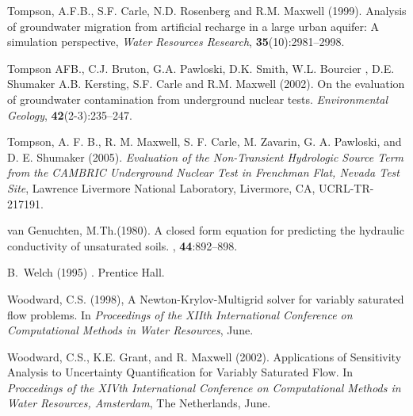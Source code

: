 \begin{thebibliography}{99}
  Tompson, A.F.B., S.F. Carle, N.D. Rosenberg and R.M. Maxwell
 (1999). Analysis of groundwater migration from artificial recharge in a large
 urban aquifer: A simulation perspective, {\em Water Resources
Research}, {\bf 35}(10):2981--2998.

Tompson AFB., C.J. Bruton, G.A. Pawloski, D.K. Smith, W.L. Bourcier , D.E. Shumaker A.B. Kersting, S.F. Carle and R.M. Maxwell (2002). On the evaluation of groundwater contamination from underground nuclear tests.  {\em Environmental Geology}, {\bf 42}(2-3):235--247.

Tompson, A. F. B., R. M. Maxwell, S. F. Carle, M. Zavarin, G. A. Pawloski, and D. E. Shumaker (2005). {\em Evaluation of the Non-Transient Hydrologic Source Term from the CAMBRIC Underground Nuclear Test in Frenchman Flat, Nevada Test Site}, Lawrence Livermore National Laboratory, Livermore, CA, UCRL-TR-217191.

{van Genuchten}, M.Th.(1980). 
\newblock A closed form equation for predicting the hydraulic conductivity of
  unsaturated soils.
, {\bf 44}:892--898.

B.~Welch (1995)
.
\newblock Prentice Hall.

Woodward, C.S. (1998),
\newblock A {N}ewton-{K}rylov-{M}ultigrid solver for variably saturated flow
  problems.
\newblock In {\em Proceedings of the XIIth International Conference on
  Computational Methods in Water Resources}, June.

Woodward, C.S., K.E. Grant, and R. Maxwell (2002). Applications of Sensitivity Analysis to Uncertainty Quantification for Variably Saturated Flow.
\newblock In {\em Proccedings of the XIVth International Conference on Computational Methods in Water Resources, Amsterdam}, The Netherlands, June.

\end{thebibliography}
